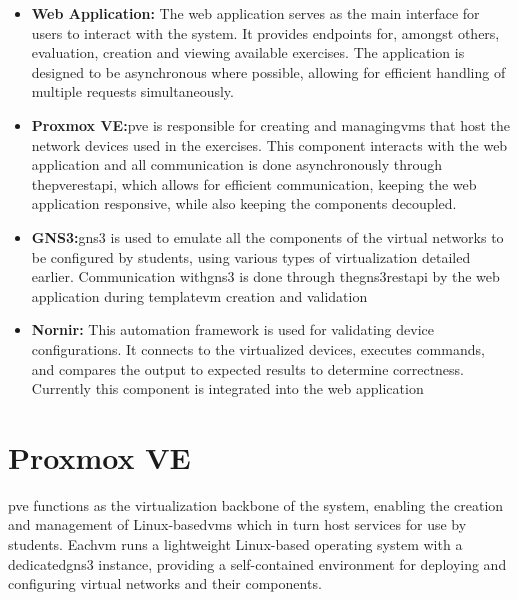     \begin{itemize}
        \item \textbf{Web Application:} The web application serves as the main interface for users to interact with the system. It provides 
        endpoints for, amongst others, evaluation, creation  and viewing available exercises. The application is designed to be asynchronous 
        where possible, allowing for efficient handling of multiple requests simultaneously.
        
        \item \textbf{Proxmox VE:}\ac{pve} is responsible for creating and managing\ac{vm}s that host the network devices used in 
        the exercises. This component interacts with the web application and all communication is done asynchronously through 
        the\ac{pve}\ac{rest}\ac{api}, which allows for efficient communication, keeping the web application responsive, while also 
        keeping the components decoupled.
        
        \item \textbf{GNS3:}\ac{gns3} is used to emulate all the components of the virtual networks to be configured by students, 
        using various types of virtualization detailed earlier. Communication with\ac{gns3} is done through 
        the\ac{gns3}\ac{rest}\ac{api} by the web application during template\ac{vm} creation and validation

        \item \textbf{Nornir:} This automation framework is used for validating device configurations. It connects to the 
        virtualized devices, executes commands, and compares the output to expected results to determine correctness.
        Currently this component is integrated into the web application
    \end{itemize}

\section{Proxmox VE}

    \ac{pve} functions as the virtualization backbone of the system, enabling the creation and management of Linux-based\ac{vm}s 
    which in turn host services for use by students. Each\ac{vm} runs a lightweight Linux-based operating system with a 
    dedicated\ac{gns3} instance, providing a self-contained environment for deploying and configuring virtual networks 
    and their components.

